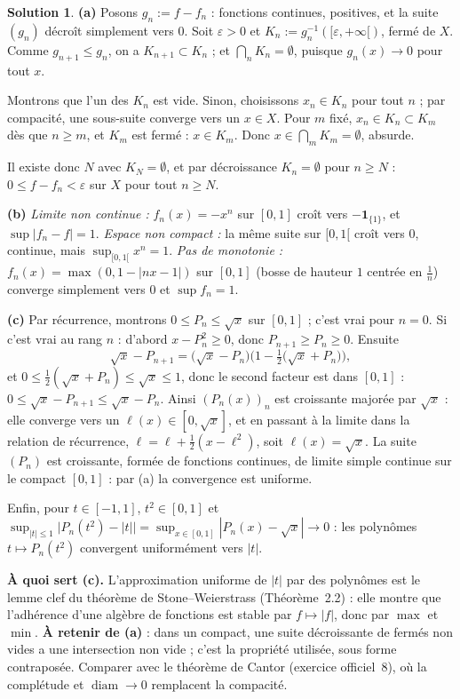 \documentclass[11pt,a4paper]{article}
\newcommand{\diam}{\operatorname{diam}}
\theoremstyle{definition}
\newtheorem*{solution}{Solution}
\begin{document}
\begin{solution}
\noindent\textbf{(a)} Posons $g_n:=f-f_n$ : fonctions continues, positives, et la suite $(g_n)$ décroît simplement vers $0$. Soit $\varepsilon>0$ et $K_n:=g_n^{-1}([\varepsilon,+\infty[)$, fermé de $X$. Comme $g_{n+1}\le g_n$, on a $K_{n+1}\subset K_n$ ; et $\bigcap_nK_n=\emptyset$, puisque $g_n(x)\to0$ pour tout $x$.

Montrons que l'un des $K_n$ est vide. Sinon, choisissons $x_n\in K_n$ pour tout $n$ ; par compacité, une sous-suite converge vers un $x\in X$. Pour $m$ fixé, $x_n\in K_n\subset K_m$ dès que $n\ge m$, et $K_m$ est fermé : $x\in K_m$. Donc $x\in\bigcap_mK_m=\emptyset$, absurde.

Il existe donc $N$ avec $K_N=\emptyset$, et par décroissance $K_n=\emptyset$ pour $n\ge N$ : $0\le f-f_n<\varepsilon$ sur $X$ pour tout $n\ge N$.

\medskip
\noindent\textbf{(b)} \emph{Limite non continue :} $f_n(x)=-x^n$ sur $[0,1]$ croît vers $-\mathbf 1_{\{1\}}$, et $\sup|f_n-f|=1$. \emph{Espace non compact :} la même suite sur $[0,1[$ croît vers $0$, continue, mais $\sup_{[0,1[}x^n=1$. \emph{Pas de monotonie :} $f_n(x)=\max(0,1-|nx-1|)$ sur $[0,1]$ (bosse de hauteur $1$ centrée en $\frac1n$) converge simplement vers $0$ et $\sup f_n=1$.

\medskip
\noindent\textbf{(c)} Par récurrence, montrons $0\le P_n\le\sqrt x$ sur $[0,1]$ ; c'est vrai pour $n=0$. Si c'est vrai au rang $n$ : d'abord $x-P_n^2\ge0$, donc $P_{n+1}\ge P_n\ge0$. Ensuite
\[
\sqrt x-P_{n+1}=\big(\sqrt x-P_n\big)\Big(1-\tfrac12\big(\sqrt x+P_n\big)\Big),
\]
et $0\le\frac12(\sqrt x+P_n)\le\sqrt x\le1$, donc le second facteur est dans $[0,1]$ : $0\le\sqrt x-P_{n+1}\le\sqrt x-P_n$. Ainsi $(P_n(x))_n$ est croissante majorée par $\sqrt x$ : elle converge vers un $\ell(x)\in[0,\sqrt x]$, et en passant à la limite dans la relation de récurrence, $\ell=\ell+\frac12(x-\ell^2)$, soit $\ell(x)=\sqrt x$. La suite $(P_n)$ est croissante, formée de fonctions continues, de limite simple continue sur le compact $[0,1]$ : par (a) la convergence est uniforme.

Enfin, pour $t\in[-1,1]$, $t^2\in[0,1]$ et $\sup_{|t|\le1}\big|P_n(t^2)-|t|\big|=\sup_{x\in[0,1]}|P_n(x)-\sqrt x|\to0$ : les polynômes $t\mapsto P_n(t^2)$ convergent uniformément vers $|t|$.
\end{solution}

\begin{commentaire}
\textbf{À quoi sert (c).} L'approximation uniforme de $|t|$ par des polynômes est le lemme clef du théorème de Stone--Weierstrass (Théorème~2.2) : elle montre que l'adhérence d'une algèbre de fonctions est stable par $f\mapsto|f|$, donc par $\max$ et $\min$. \textbf{À retenir de (a)} : dans un compact, une suite décroissante de fermés non vides a une intersection non vide ; c'est la propriété utilisée, sous forme contraposée. Comparer avec le théorème de Cantor (exercice officiel~8), où la complétude et $\diam\to0$ remplacent la compacité.
\end{commentaire}
\end{document}
